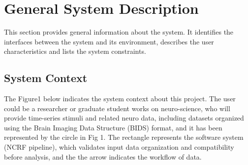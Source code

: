 \documentclass[12pt]{article}
\begin{document}
\section{General System Description}

This section provides general information about the system.  It identifies the
interfaces between the system and its environment, describes the user
characteristics and lists the system constraints.


\subsection{System Context}

The Figure1 below indicates the system context about this project.
The user could be a researcher or graduate student works on neuro-science, who will provide time-series stimuli and related neuro data, including datasets organized using the Brain Imaging Data Structure (BIDS) format, and it has been represented by the circle in Fig 1. The rectangle represents the software system (NCRF pipeline), which validates input data organization and compatibility before analysis, and the the arrow indicates the workflow of data.

\end{document}
